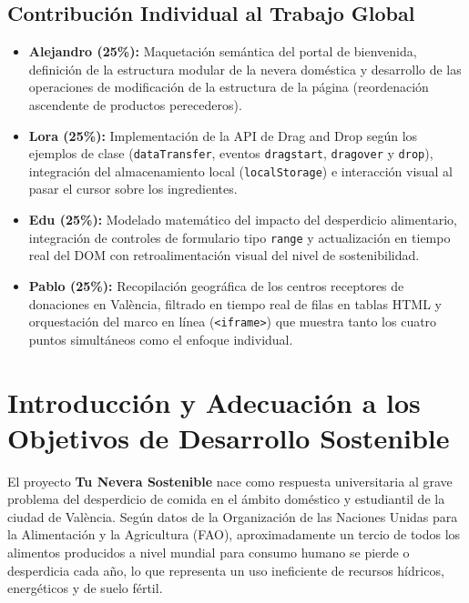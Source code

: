 \documentclass[11pt,a4paper]{article}
\begin{document}
\subsection{Contribución Individual al Trabajo Global}
\begin{itemize}
    \item \textbf{Alejandro (25\%):} Maquetación semántica del portal de bienvenida, definición de la estructura modular de la nevera doméstica y desarrollo de las operaciones de modificación de la estructura de la página (reordenación ascendente de productos perecederos).
    \item \textbf{Lora (25\%):} Implementación de la API de Drag and Drop según los ejemplos de clase (\texttt{dataTransfer}, eventos \texttt{dragstart}, \texttt{dragover} y \texttt{drop}), integración del almacenamiento local (\texttt{localStorage}) e interacción visual al pasar el cursor sobre los ingredientes.
    \item \textbf{Edu (25\%):} Modelado matemático del impacto del desperdicio alimentario, integración de controles de formulario tipo \texttt{range} y actualización en tiempo real del DOM con retroalimentación visual del nivel de sostenibilidad.
    \item \textbf{Pablo (25\%):} Recopilación geográfica de los centros receptores de donaciones en València, filtrado en tiempo real de filas en tablas HTML y orquestación del marco en línea (\texttt{<iframe>}) que muestra tanto los cuatro puntos simultáneos como el enfoque individual.
\end{itemize}

\newpage

\section{Introducción y Adecuación a los Objetivos de Desarrollo Sostenible}

El proyecto \textbf{Tu Nevera Sostenible} nace como respuesta universitaria al grave problema del desperdicio de comida en el ámbito doméstico y estudiantil de la ciudad de València. Según datos de la Organización de las Naciones Unidas para la Alimentación y la Agricultura (FAO), aproximadamente un tercio de todos los alimentos producidos a nivel mundial para consumo humano se pierde o desperdicia cada año, lo que representa un uso ineficiente de recursos hídricos, energéticos y de suelo fértil.
\end{document}
